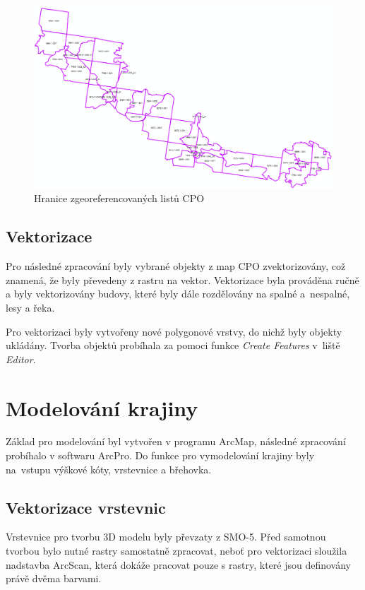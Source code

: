 \documentclass[thesis=M,czech]{FITthesis}[2012/06/26]
\begin{document}
\begin{figure}[h]
	\centering
	\includegraphics[width=17cm]{pics/klad_CPO.png}
	\caption{Hranice zgeoreferencovaných listů CPO}
	\label{obrazek:CPO_viz}
\end{figure}

\subsection{Vektorizace}
Pro následné zpracování byly vybrané objekty z map CPO zvektorizovány, což znamená, že byly převedeny z rastru na vektor. Vektorizace byla prováděna ručně a byly vektorizovány budovy, které byly dále rozdělovány na spalné a~nespalné, lesy a řeka. 

Pro vektorizaci byly vytvořeny nové polygonové vrstvy, do nichž byly objekty ukládány. Tvorba objektů probíhala za pomoci funkce \textit{Create Features} v~liště \textit{Editor}. 


\section{Modelování krajiny}
Základ pro modelování byl vytvořen v programu ArcMap, následné zpracování probíhalo v softwaru ArcPro. Do funkce pro vymodelování krajiny byly na~vstupu výškové kóty, vrstevnice a břehovka.

\subsection{Vektorizace vrstevnic}
Vrstevnice pro tvorbu 3D modelu byly převzaty z SMO-5. Před samotnou tvorbou bylo nutné rastry samostatně zpracovat, neboť pro vektorizaci sloužila nadstavba ArcScan, která dokáže pracovat pouze s rastry, které jsou definovány právě dvěma barvami. 
\end{document}
